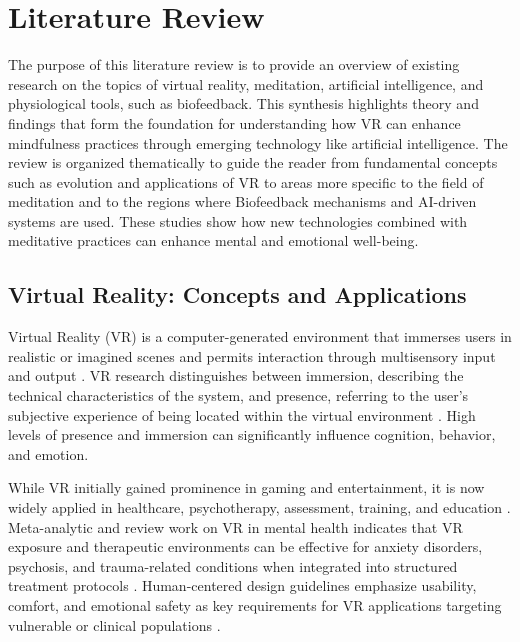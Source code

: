 
\chapter{Literature Review}

The purpose of this literature review is to provide an overview of existing research on the topics of virtual reality, meditation, artificial intelligence, and physiological tools, such as biofeedback. This synthesis highlights theory and findings that form the foundation for understanding how VR can enhance mindfulness practices through emerging technology like artificial intelligence. The review is organized thematically to guide the reader from fundamental concepts such as evolution and applications of VR to areas more specific to the field of meditation and to the regions where Biofeedback mechanisms and AI-driven systems are used. These studies show how new technologies combined with meditative practices can enhance mental and emotional well-being.



 \section{Virtual Reality: Concepts and Applications}
Virtual Reality (VR) is a computer-generated environment that immerses users in realistic or imagined scenes and permits interaction through multisensory input and output \cite{jerald2016vrbook}. VR research distinguishes between immersion, describing the technical characteristics of the system, and presence, referring to the user’s subjective experience of being located within the virtual environment \cite{slater2018immersive,bryson1996vrdesign}. High levels of presence and immersion can significantly influence cognition, behavior, and emotion.

While VR initially gained prominence in gaming and entertainment, it is now widely applied in healthcare, psychotherapy, assessment, training, and education \cite{freeman2017virtual,rehm2021virtual,baker2019vrtherapy}. Meta-analytic and review work on VR in mental health indicates that VR exposure and therapeutic environments can be effective for anxiety disorders, psychosis, and trauma-related conditions when integrated into structured treatment protocols \cite{freeman2017virtual,rehm2021virtual}. Human-centered design guidelines emphasize usability, comfort, and emotional safety as key requirements for VR applications targeting vulnerable or clinical populations \cite{jerald2016vrbook}.

